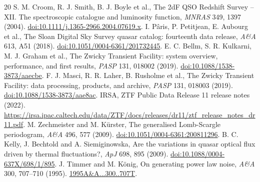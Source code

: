 \documentclass[11pt]{article}
\begin{document}
\begin{thebibliography}{20}
 S. M. Croom, R. J. Smith, B. J. Boyle et al., The 2dF QSO Redshift Survey -- XII. The spectroscopic catalogue and luminosity function, \emph{MNRAS} 349, 1397 (2004). \href{https://doi.org/10.1111/j.1365-2966.2004.07619.x}{doi:10.1111/j.1365-2966.2004.07619.x}.
 I. P\^aris, P. Petitjean, E. Aubourg et al., The Sloan Digital Sky Survey quasar catalog: fourteenth data release, \emph{A\&A} 613, A51 (2018). \href{https://doi.org/10.1051/0004-6361/201732445}{doi:10.1051/0004-6361/201732445}.
 E. C. Bellm, S. R. Kulkarni, M. J. Graham et al., The Zwicky Transient Facility: system overview, performance, and first results, \emph{PASP} 131, 018002 (2019). \href{https://doi.org/10.1088/1538-3873/aaecbe}{doi:10.1088/1538-3873/aaecbe}.
 F. J. Masci, R. R. Laher, B. Rusholme et al., The Zwicky Transient Facility: data processing, products, and archive, \emph{PASP} 131, 018003 (2019). \href{https://doi.org/10.1088/1538-3873/aae8ac}{doi:10.1088/1538-3873/aae8ac}.
 IRSA, ZTF Public Data Release 11 release notes (2022). \url{https://irsa.ipac.caltech.edu/data/ZTF/docs/releases/dr11/ztf_release_notes_dr11.pdf}.
 M. Zechmeister and M. K\"urster, The generalised Lomb-Scargle periodogram, \emph{A\&A} 496, 577 (2009). \href{https://doi.org/10.1051/0004-6361:200811296}{doi:10.1051/0004-6361:200811296}.
 B. C. Kelly, J. Bechtold and A. Siemiginowska, Are the variations in quasar optical flux driven by thermal fluctuations?, \emph{ApJ} 698, 895 (2009). \href{https://doi.org/10.1088/0004-637X/698/1/895}{doi:10.1088/0004-637X/698/1/895}.
 J. Timmer and M. K\"onig, On generating power law noise, \emph{A\&A} 300, 707--710 (1995). \href{https://ui.adsabs.harvard.edu/abs/1995A&A...300..707T}{1995A\&A...300..707T}.
\end{thebibliography}
\end{document}
